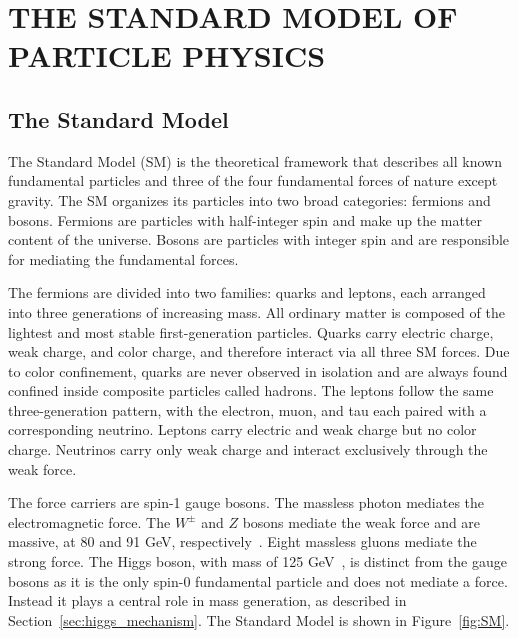 \begingroup
\clearpage%
\let\clearpage\relax%
\vspace*{-16pt}%
\chapter[THE STANDARD MODEL OF PARTICLE PHYSICS]{THE STANDARD MODEL OF PARTICLE PHYSICS}\label{chap:sm}
\endgroup


\section{The Standard Model}

The Standard Model (SM) is the theoretical framework that describes all known fundamental particles and three of the four fundamental forces of nature except gravity. 
The SM organizes its particles into two broad categories: fermions and bosons. 
Fermions are particles with half-integer spin and make up the matter content of the universe. 
Bosons are particles with integer spin and are responsible for mediating the fundamental forces.

The fermions are divided into two families: quarks and leptons, each arranged into three generations of increasing mass. 
All ordinary matter is composed of the lightest and most stable first-generation particles. 
Quarks carry electric charge, weak charge, and color charge, and therefore interact via all three SM forces.
Due to color confinement, quarks are never observed in isolation and are always found confined inside composite particles called hadrons.
The leptons follow the same three-generation pattern, with the electron, muon, and tau each paired with a corresponding neutrino. 
Leptons carry electric and weak charge but no color charge. 
Neutrinos carry only weak charge and interact exclusively through the weak force.

The force carriers are spin-1 gauge bosons. 
The massless photon mediates the electromagnetic force. 
The $W^\pm$ and $Z$ bosons mediate the weak force and are massive, at 80 and 91 GeV, respectively~\cite{PDG2022}.
Eight massless gluons mediate the strong force. 
The Higgs boson, with mass of 125 GeV~\cite{PDG2022}, is distinct from the gauge bosons as it is the only spin-0 fundamental particle and does not mediate a force. 
Instead it plays a central role in mass generation, as described in Section~\ref{sec:higgs_mechanism}. 
The Standard Model is shown in Figure~\ref{fig:SM}.

